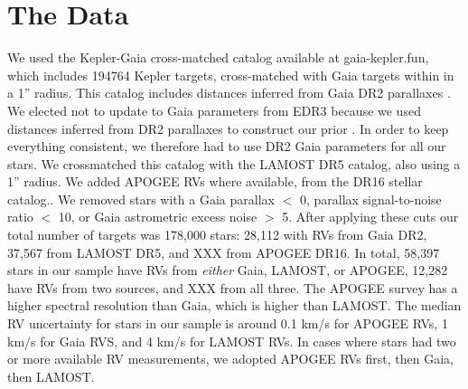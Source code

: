 \section{The Data}
\label{sec:data}

We used the Kepler-Gaia cross-matched catalog available at gaia-kepler.fun,
which includes 194764 Kepler targets, cross-matched with Gaia targets within
in a 1'' radius.
This catalog includes distances inferred from Gaia DR2 parallaxes
\citep{bailer-jones2018}.
We elected not to update to Gaia parameters from EDR3 because we used
distances inferred from DR2 parallaxes to construct our prior
\citep{bailer-jones2018}.
In order to keep everything consistent, we therefore had to use DR2 Gaia
parameters for all our stars.
We crossmatched this catalog with the LAMOST DR5 catalog, also using a 1''
radius.
We added APOGEE RVs where available, from the DR16 stellar catalog..
We removed stars with a Gaia parallax $<$ 0, parallax signal-to-noise ratio
$<$ 10, or Gaia astrometric excess noise $>$ 5.
After applying these cuts our total number of targets was 178,000 stars:
28,112 with RVs from Gaia DR2, 37,567 from LAMOST DR5, and XXX from APOGEE
DR16.
In total, 58,397 stars in our sample have RVs from {\it either} Gaia,
LAMOST, or APOGEE, 12,282 have RVs from two sources, and XXX from all three.
The APOGEE survey has a higher spectral resolution than Gaia, which is higher
than LAMOST.
The median RV uncertainty for stars in our sample is around 0.1 km/s for
APOGEE RVs, 1 km/s for Gaia RVS, and 4 km/s for LAMOST RVs.
In cases where stars had two or more available RV measurements, we adopted
APOGEE RVs first, then Gaia, then LAMOST.

